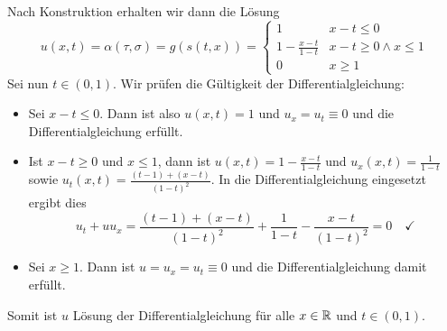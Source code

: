 \begin{exercisePage}
\begin{enumerate}[label=(zu \alph*), leftmargin=*]
	Nach Konstruktion erhalten wir dann die Lösung
	\begin{equation*}
		u(x,t) = \alpha(\tau,\sigma) = g(s(t,x)) = \begin{cases}
			1                   & x - t \le 0 \\
			1 - \frac{x-t}{1-t} & x-t \ge 0 \land x \le 1 \\
			0                   & x \ge 1
		\end{cases} 
	\end{equation*}
	Sei nun $t \in (0,1)$. Wir prüfen die Gültigkeit der Differentialgleichung:
	\begin{itemize}
		\item Sei $x - t \le 0$.  Dann ist also $u(x,t) = 1$ und $u_x = u_t \equiv 0$ und die Differentialgleichung erfüllt. 
		\item Ist $x-t \ge 0$ und $x \le 1$, dann ist $u(x,t) = 1 - \frac{x-t}{1-t}$ und $u_x(x,t) = \frac{1}{1-t}$ sowie $u_t(x,t) = \frac{(t-1)+(x-t)}{(1-t)^2}$. In die Differentialgleichung eingesetzt ergibt dies
		\begin{equation*}
			u_t + u u_x = \frac{(t-1)+(x-t)}{(1-t)^2} + \frac{1}{1-t} - \frac{x-t}{(1-t)^2} = 0 \quad \checkmark
		\end{equation*}
		\item Sei $x \ge 1$. Dann ist $u = u_x = u_t \equiv 0$ und die Differentialgleichung damit erfüllt.
	\end{itemize}
	Somit ist $u$ Lösung der Differentialgleichung für alle $x \in \mathbb{R}$ und $t \in (0,1)$.
\end{enumerate}
\end{exercisePage}